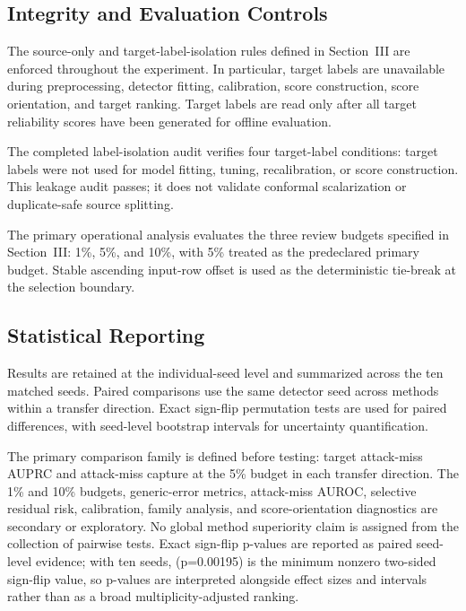 \documentclass[conference]{IEEEtran}
\begin{document}
\subsection{Integrity and Evaluation Controls}

The source-only and target-label-isolation rules defined in Section~III are enforced throughout the experiment. In particular, target labels are unavailable during preprocessing, detector fitting, calibration, score construction, score orientation, and target ranking. Target labels are read only after all target reliability scores have been generated for offline evaluation.

The completed label-isolation audit verifies four target-label conditions: target labels were not used for model fitting, tuning, recalibration, or score construction. This leakage audit passes; it does not validate conformal scalarization or duplicate-safe source splitting.

The primary operational analysis evaluates the three review budgets specified in Section~III: 1\%, 5\%, and 10\%, with 5\% treated as the predeclared primary budget. Stable ascending input-row offset is used as the deterministic tie-break at the selection boundary.

\subsection{Statistical Reporting}

Results are retained at the individual-seed level and summarized across the ten matched seeds. Paired comparisons use the same detector seed across methods within a transfer direction. Exact sign-flip permutation tests are used for paired differences, with seed-level bootstrap intervals for uncertainty quantification.

The primary comparison family is defined before testing: target attack-miss AUPRC and attack-miss capture at the 5\% budget in each transfer direction. The 1\% and 10\% budgets, generic-error metrics, attack-miss AUROC, selective residual risk, calibration, family analysis, and score-orientation diagnostics are secondary or exploratory. No global method superiority claim is assigned from the collection of pairwise tests. Exact sign-flip p-values are reported as paired seed-level evidence; with ten seeds, (p=0.00195) is the minimum nonzero two-sided sign-flip value, so p-values are interpreted alongside effect sizes and intervals rather than as a broad multiplicity-adjusted ranking.
\end{document}
